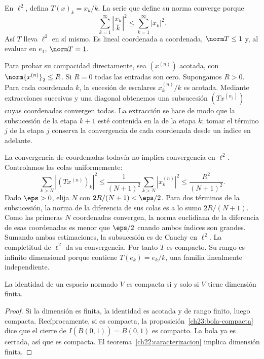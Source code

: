 \begin{ejemplo}\label{ch23:diagonal}
En $\ell^2$, defina $T(x)_k=x_k/k$. La serie que define su norma converge porque
\[
 \sum_{k=1}^{\infty}\left|\frac{x_k}{k}\right|^2\leq\sum_{k=1}^{\infty}|x_k|^2.
\]
Así $T$ lleva $\ell^2$ en sí mismo. Es lineal coordenada a coordenada, $\norm T\leq1$ y, al evaluar en $e_1$, $\norm T=1$.

Para probar su compacidad directamente, sea $(x^{(n)})$ acotada, con $\norm{x^{(n)}}_2\leq R$. Si $R=0$ todas las entradas son cero. Supongamos $R>0$. Para cada coordenada $k$, la sucesión de escalares $x^{(n)}_k/k$ es acotada. Mediante extracciones sucesivas y una diagonal obtenemos una subsucesión $(Tx^{(n_j)})$ cuyas coordenadas convergen todas. La extracción se hace de modo que la subsucesión de la etapa $k+1$ esté contenida en la de la etapa $k$; tomar el término $j$ de la etapa $j$ conserva la convergencia de cada coordenada desde un índice en adelante.

La convergencia de coordenadas todavía no implica convergencia en $\ell^2$. Controlamos las colas uniformemente:
\[
 \sum_{k>N}|(Tx^{(n)})_k|^2
 \leq\frac1{(N+1)^2}\sum_{k>N}|x^{(n)}_k|^2
 \leq\frac{R^2}{(N+1)^2}.
\]
Dado $\eps>0$, elija $N$ con $2R/(N+1)<\eps/2$. Para dos términos de la subsucesión, la norma de la diferencia de sus colas es a lo sumo $2R/(N+1)$. Como las primeras $N$ coordenadas convergen, la norma euclidiana de la diferencia de esas coordenadas es menor que $\eps/2$ cuando ambos índices son grandes. Sumando ambas estimaciones, la subsucesión es de Cauchy en $\ell^2$. La completitud de $\ell^2$ da su convergencia. Por tanto $T$ es compacto. Su rango es infinito dimensional porque contiene $T(e_k)=e_k/k$, una familia linealmente independiente.
\end{ejemplo}

\begin{teorema}\label{ch23:identidad}
La identidad de un espacio normado $V$ es compacta si y solo si $V$ tiene dimensión finita.
\end{teorema}
\begin{proof}
Si la dimensión es finita, la identidad es acotada y de rango finito, luego compacta. Recíprocamente, si es compacta, la proposición~\ref{ch23:bola-compacta} dice que el cierre de $I(\overline B(0,1))=\overline B(0,1)$ es compacto. La bola ya es cerrada, así que es compacta. El teorema~\ref{ch22:caracterizacion} implica dimensión finita.
\end{proof}


